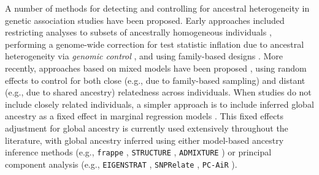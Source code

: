 \documentclass[12pt]{article}
\begin{document}
A number of methods for detecting and controlling for ancestral heterogeneity in genetic association studies have been proposed. 
Early approaches included restricting analyses to subsets of ancestrally homogeneous individuals \citep{lander1994}, performing a genome-wide correction for test statistic inflation due to ancestral heterogeneity via \textit{genomic control} \citep{GenomicControl}, and using family-based designs \citep{tdt}. 
More recently, approaches based on mixed models have been proposed \citep{yu2006, kang2010, yang2014}, using random effects to control for both close (e.g., due to family-based sampling) and distant (e.g., due to shared ancestry) relatedness across individuals.
When studies do not include closely related individuals, a simpler approach is to include inferred global ancestry as a fixed effect in marginal regression models \citep{eigenstrat, pritchard2000}. 
This fixed effects adjustment for global ancestry is currently used extensively throughout the literature, with global ancestry inferred using either model-based ancestry inference methods (e.g., \texttt{frappe} \citep{tang2005}, \texttt{STRUCTURE} \cite{structure}, \texttt{ADMIXTURE} \citep{admixture}) or principal component analysis (e.g., \texttt{EIGENSTRAT} \citep{eigenstrat}, \texttt{SNPRelate} \citep{snprelate}, \texttt{PC-AiR} \citep{conomos2015}).

\end{document}
